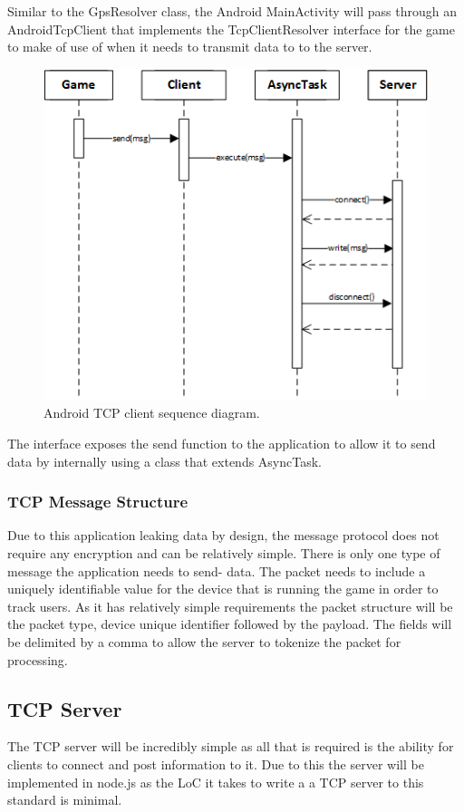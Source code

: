 Similar to the GpsResolver class, the Android MainActivity will pass through an AndroidTcpClient that implements the TcpClientResolver interface for the game to make of use of when it needs to transmit data to to the server.

\begin{figure}[h!]
\centering\includegraphics[width=\linewidth]{design/figures/tcp-client-sd.png}
\caption{Android TCP client sequence diagram.}
\end{figure}

The interface exposes the send function to the application to allow it to send data by internally using a class that extends AsyncTask.
\newpage
\subsubsection{TCP Message Structure}
\label{design:tcp-structure}
Due to this application leaking data by design, the message protocol does not require any encryption and can be relatively simple. There is only one type of message the application needs to send- data. The packet needs to include a uniquely identifiable value for the device that is running the game in order to track users. As it has relatively simple requirements the packet structure will be the packet type, device unique identifier followed by the payload. The fields will be delimited by a comma to allow the server to tokenize the packet for processing.

\subsection{TCP Server}
The TCP server will be incredibly simple as all that is required is the ability for clients to connect and post information to it. Due to this the server will be implemented in node.js as the LoC it takes to write a a TCP server to this standard is minimal.

